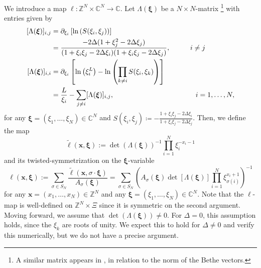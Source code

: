 \documentclass[a4paper,11pt]{article}
\theoremstyle{definition}
\begin{document}
We introduce a map $\ell: \mathbb{Z}^N \times \mathbb{C}^N \rightarrow \mathbb{C}$. Let $\Lambda (\boldsymbol{\xi})$ be a $N\times N$-matrix \footnote{A similar matrix appears in \cite{korepin_calculation_1982},\cite{gaudin_normalization_1981} in relation to the norm of the Bethe vectors.} with entries given by 
\begin{equation}\label{e:lambda_mat}
\begin{split}
    [\Lambda(\boldsymbol{\xi})]_{i, j} 
    &= \partial_{\xi_i}\left[\ln\left(S(\xi_i,\xi_j) \right)\right]\\
    &= \frac{-2\Delta(1 + \xi_j^2 - 2\Delta \xi_j)}{(1 + \xi_i \xi_j - 2\Delta \xi_i)(1 + \xi_i \xi_j - 2\Delta \xi_j)}, \hspace{10mm} i \neq j \\
    [\Lambda(\boldsymbol{\xi})]_{i, i}&=\partial_{\xi_i}\left[\ln\left(\xi_i^L \right) - \ln\left(\prod_{k\neq i}S(\xi_i,\xi_k) \right) \right]\\
    &= \frac{L}{\xi_i} - \sum_{j \neq i} [\Lambda(\boldsymbol{\xi})]_{i, j}, \hspace{41mm} i=1, \dots, N,
\end{split}
\end{equation}
for any $\boldsymbol{\xi} = (\xi_1, \dots, \xi_N) \in \mathbb{C}^N$ and $S(\xi_i,\xi_j) \coloneq -\frac{1+\xi_i\xi_j-2\Delta\xi_i}{1+\xi_i\xi_j-2\Delta\xi_j}$. Then, we define the map
\begin{equation}
    \tilde{\ell}(\mathbf{x}, \boldsymbol{\xi}) := \det(\Lambda(\boldsymbol{\xi}))^{-1} \prod_{i=1}^{N} \xi_{i}^{-x_i-1}
\end{equation}
and its twisted-symmetrization on the $\boldsymbol{\xi}$-variable
\begin{equation}\label{e:l_coeff}
    \ell(\mathbf{x}, \boldsymbol{\xi}) := \sum_{\sigma \in S_N} \frac{\tilde{\ell}(\mathbf{x}, \sigma \cdot \boldsymbol{\xi} )}{A_{\sigma}(\boldsymbol{\xi})} = \sum_{\sigma \in S_N}\left( A_{\sigma}(\boldsymbol{\xi}) \det[\Lambda(\boldsymbol{\xi})] \prod_{i =1}^N \xi_{\sigma(i)}^{x_i +1} \right)^{-1}
\end{equation}
for any $\mathbf{x} = (x_1, \dots, x_N) \in \mathbb{Z}^N$ and any $\boldsymbol{\xi} = (\xi_1, \dots, \xi_N) \in \mathbb{C}^N$. Note that the $\ell$-map is well-defined on $\mathbb{Z}^N \times \Xi$ since it is symmetric on the second argument. Moving forward, we assume that $\det(\Lambda(\boldsymbol{\xi}))\neq0$. For $\Delta=0$, this assumption holds, since the $\xi_k$ are roots of unity. We expect this to hold for $\Delta\neq0$ and verify this numerically, but we do not have a precise argument.  
\end{document}
